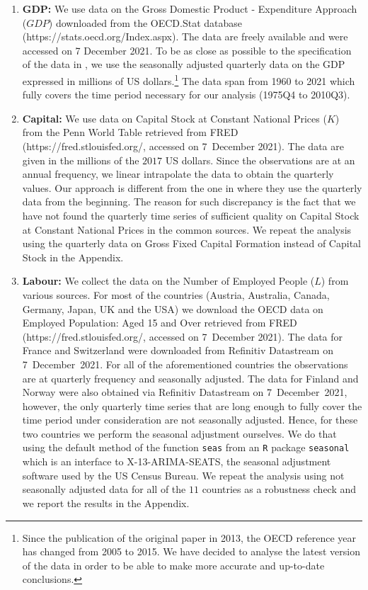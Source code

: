 \documentclass[a4paper,12pt]{article}
\begin{document}
{\begin{enumerate}
\item \textbf{GDP:} We use data on the Gross Domestic Product - Expenditure Approach ($GDP$) downloaded from the OECD.Stat \nocite{OECD} database (https://stats.oecd.org/Index.aspx). The data are freely available and were accessed on 7 December 2021. To be as close as possible to the specification of the data in \cite{Zhang2012}, we use the seasonally adjusted quarterly data on the GDP expressed in millions of  US dollars.\footnote{Since the publication of the original paper in 2013, the OECD reference year has changed from 2005 to 2015. We have decided to analyse the latest version of the data in order to be able to make more accurate and up-to-date conclusions.} The data span from 1960 to 2021 which fully covers the time period necessary for our analysis (1975Q4 to 2010Q3). 
\item \textbf{Capital:} We use data on Capital Stock at Constant National Prices ($K$) from the Penn World Table \citep{Feenstra2015} retrieved from FRED \linebreak (https://fred.stlouisfed.org/, accessed on 7~December 2021). The data are given in the millions of the $2017$ US dollars. Since the observations are at an annual frequency, we linear intrapolate the data to obtain the quarterly values. Our approach is different from the one in \cite{Zhang2012} where they use the quarterly data from the beginning. The reason for such discrepancy is the fact that we have not found the quarterly time series of sufficient quality on Capital Stock at Constant National Prices in the common sources. We repeat the analysis using the quarterly data on Gross Fixed Capital Formation instead of Capital Stock in the Appendix.
\item \textbf{Labour:} We collect the data on the Number of Employed People ($L$) from various sources. For most of the countries (Austria, Australia, Canada, Germany, Japan, UK and the USA) we download the OECD data on Employed Population: Aged 15 and Over retrieved from FRED (https://fred.stlouisfed.org/, accessed on 7~December 2021). \nocite{OECDempl} The data for France and Switzerland were downloaded from Refinitiv Datastream on 7~December~2021. For all of the aforementioned countries the observations are at quarterly frequency and seasonally adjusted. The data for Finland and Norway were also obtained via Refinitiv Datastream on 7~December~2021, however, the only quarterly time series that are long enough to fully cover the time period under consideration are not seasonally adjusted. Hence, for these two countries we perform the seasonal adjustment ourselves. We do that using the default method of the function \verb|seas| from an \verb|R| package \verb|seasonal| \citep*{Sax2018} which is an interface to X-13-ARIMA-SEATS, the seasonal adjustment software used by the US Census Bureau. We repeat the analysis using not seasonally adjusted data for all of the $11$ countries as a robustness check and we report the results in the Appendix.


\end{enumerate}}
\end{document}
